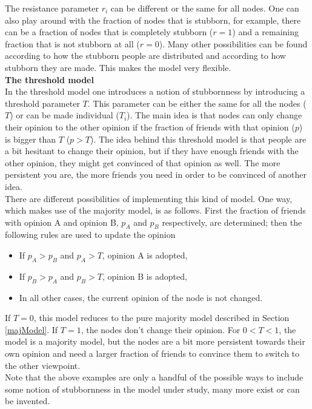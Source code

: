 \documentclass[11 pt , letterpaper , twoside , openright]{book}
\begin{document}
The resistance parameter $r_i$ can be different or the same for all nodes. One can also play around with the fraction of nodes that is stubborn, for example, there can be a fraction of nodes that is completely stubborn ($r = 1$) and a remaining fraction that is not stubborn at all ($r = 0$). Many other possibilities can be found according to how the stubborn people are distributed and according to how stubborn they are made. This makes the model very flexible.\\
\newline
\textbf{The threshold model}\\
\newline
In the threshold model one introduces a notion of stubbornness by introducing a threshold parameter $T$. This parameter can be either the same for all the nodes ($T$) or can be made individual ($T_i$). The main idea is that nodes can only change their opinion to the other opinion if the fraction of friends with that opinion ($p$) is bigger than $T$ ($p > T$). The idea behind this threshold model is that people are a bit hesitant to change their opinion, but if they have enough friends with the other opinion, they might get convinced of that opinion as well. The more persistent you are, the more friends you need in order to be convinced of another idea. \\
\newline
There are different possibilities of implementing this kind of model. One way, which makes use of the majority model, is as follows. First the fraction of friends with opinion A and opinion B, $p_A$ and $p_B$ respectively, are determined; then the following rules are used to update the opinion
\begin{itemize}
	\item If $p_A > p_B$ and $p_A > T$, opinion A is adopted,
	\item If $p_B > p_A$ and $p_B > T$, opinion B is adopted,
	\item In all other cases, the current opinion of the node is not changed.
\end{itemize}
If $T = 0$, this model reduces to the pure majority model described in Section \ref{majModel}. If $T = 1$, the nodes don't change their opinion. For $0 < T < 1$, the model is a majority model, but the nodes are a bit more persistent towards their own opinion and need a larger fraction of friends to convince them to switch to the other viewpoint.\\
\newline
Note that the above examples are only a handful of the possible ways to include some notion of stubbornness in the model under study, many more exist or can be invented.
\end{document}
